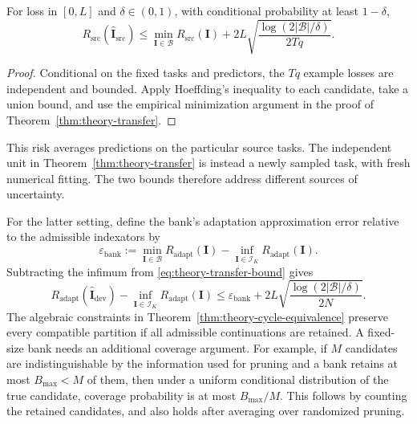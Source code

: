 \begin{proposition}
    \label{prop:theory-source-selection}
    For loss in $[0,L]$ and $\delta\in(0,1)$, with conditional
    probability at least $1-\delta$,
    \begin{equation}
        R_{\mathrm{src}}(\widehat{\mathbf I}_{\mathrm{src}})
        \le \min_{\mathbf I\in\mathcal B}R_{\mathrm{src}}(\mathbf I)
            +2L\sqrt{\frac{\log(2|\mathcal B|/\delta)}
                              {2Tq}}.
        \label{eq:appendix-theory-source-selection}
    \end{equation}
\end{proposition}

\begin{proof}
    Conditional on the fixed tasks and predictors, the
    $Tq$ example losses are independent and
    bounded. Apply Hoeffding's inequality to each candidate,
    take a union bound, and use the empirical minimization
    argument in the proof of Theorem~\ref{thm:theory-transfer}.
\end{proof}

This risk averages predictions on the particular source tasks.
The independent unit in Theorem~\ref{thm:theory-transfer} is instead
a newly sampled task, with fresh numerical fitting.
The two bounds therefore address different sources of uncertainty.

For the latter setting, define the bank's adaptation approximation
error relative to the admissible indexators by
\begin{equation*}
    \varepsilon_{\mathrm{bank}}
    :=\min_{\mathbf I\in\mathcal B}
        R_{\mathrm{adapt}}(\mathbf I)
        -\inf_{\mathbf I\in\mathcal I_K}
        R_{\mathrm{adapt}}(\mathbf I).
\end{equation*}
Subtracting the infimum from
\eqref{eq:theory-transfer-bound} gives
\begin{equation*}
    R_{\mathrm{adapt}}
        (\widehat{\mathbf I}_{\mathrm{dev}})
        -\inf_{\mathbf I\in\mathcal I_K}
            R_{\mathrm{adapt}}(\mathbf I)
    \le \varepsilon_{\mathrm{bank}}
        +2L\sqrt{\frac{\log(2|\mathcal B|/\delta)}
                         {2N}}.
\end{equation*}
The algebraic constraints in
Theorem~\ref{thm:theory-cycle-equivalence} preserve every compatible
partition if all admissible continuations are retained.
A fixed-size bank needs an additional coverage argument.
For example, if $M$ candidates are indistinguishable by the information
used for pruning and a bank retains at most $B_{\max}<M$ of them,
then under a uniform conditional distribution of the true candidate,
coverage probability is at most $B_{\max}/M$.
This follows by counting the retained candidates, and also holds
after averaging over randomized pruning.
